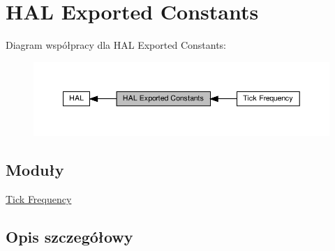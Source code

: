 \hypertarget{group___h_a_l___exported___constants}{}\section{H\+AL Exported Constants}
\label{group___h_a_l___exported___constants}
Diagram współpracy dla H\+AL Exported Constants\+:\nopagebreak
\begin{figure}[H]
\begin{center}
\leavevmode
\includegraphics[width=350pt]{group___h_a_l___exported___constants}
\end{center}
\end{figure}
\subsection*{Moduły}
\begin{DoxyCompactItemize}
\item 
\hyperlink{group___h_a_l___t_i_c_k___f_r_e_q}{Tick Frequency}
\end{DoxyCompactItemize}


\subsection{Opis szczegółowy}
